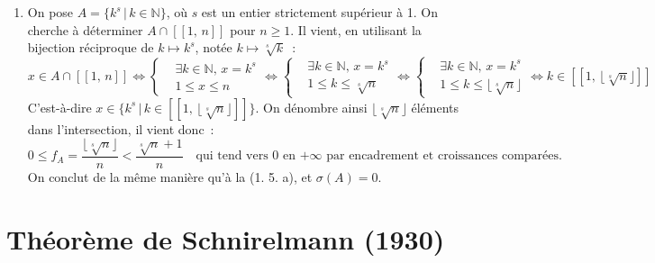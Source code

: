 \documentclass{article}
\newcommand{\ie}[2]{\left[\!\left[#1,\, #2\right]\!\right]} %
\begin{document}
\begin{enumerate}
\begin{enumerate}
      \item On pose $A = \{k^s \,\vert\, k \in \mathbb{N}\}$, où $s$ est un entier strictement supérieur à 1. On cherche à déterminer $A \cap \ie{1}{n}$ pour $n \geqslant 1$. Il vient, en utilisant la bijection réciproque de $k \mapsto k^s$, notée $k \mapsto \sqrt[s]{k}$~:
      \[
        x \in A \cap \ie{1}{n} \iff \left\{\begin{aligned}
          &\exists k \in \mathbb{N},\, x = k^s \\
          &1 \leqslant x \leqslant n
        \end{aligned}\right.
        \iff \left\{\begin{aligned}
          &\exists k \in \mathbb{N},\, x = k^s \\
          &1 \leqslant k \leqslant \sqrt[s]{n}
        \end{aligned}\right.
        \iff \left\{\begin{aligned}
          &\exists k \in \mathbb{N},\, x = k^s \\
          &1 \leqslant k \leqslant \lfloor\sqrt[s]{n}\rfloor
        \end{aligned}\right.
        \iff k \in \ie{1}{\lfloor\sqrt[s]{n}\rfloor}
      \]
      C'est-à-dire $x \in \{k^s  \,\vert\, k \in \ie{1}{\lfloor\sqrt[s]{n}\rfloor} \}$. On dénombre ainsi $\lfloor\sqrt[s]{n}\rfloor$ éléments dans l'intersection, il vient donc~:
      \[
        0 \leqslant f_A = \frac{\lfloor\sqrt[s]{n}\rfloor}{n} < \frac{\sqrt[s]{n} + 1}{n} \quad \text{qui tend vers 0 en $+\infty$ par encadrement et croissances comparées.}
      \]
      On conclut de la même manière qu'à la (1. 5. a), et $\sigma(A) = 0$.
    \end{enumerate}
  \end{enumerate}

  \section{Théorème de Schnirelmann (1930)}
\end{document}
